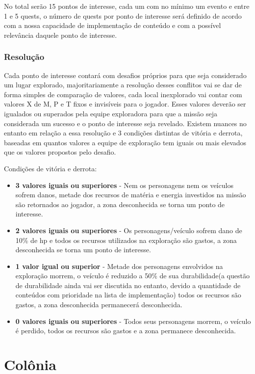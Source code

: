 \documentclass[11pt]{article} %
\begin{document}
No total serão 15 pontos de interesse, cada um com no mínimo um evento e entre 1 e 5 quests, o número de quests por ponto de interesse será definido de acordo com a nossa capacidade de implementação de conteúdo e com a possível relevância daquele ponto de interesse.

\subsubsection{Resolução}
Cada ponto de interesse contará com desafios próprios para que seja considerado um lugar explorado, majoritariamente a resolução desses conflitos vai se dar de forma simples de comparação de valores, cada local inexplorado vai contar com valores X de M, P e T fixos e invisíveis para o jogador. Esses valores deverão ser igualados ou superados pela equipe exploradora para que a missão seja considerada um sucesso e o ponto de interesse seja revelado. Existem nuances no entanto em relação a essa resolução e 3 condições distintas de vitória e derrota, baseadas em quantos valores a equipe de exploração tem iguais ou mais elevados que os valores propostos pelo desafio.

Condições de vitória e derrota:
\begin{itemize}
  \item \textbf{3 valores iguais ou superiores} - Nem os personagens nem os veículos sofrem danos, metade dos recursos de matéria e energia investidos na missão são retornados ao jogador, a zona desconhecida se torna um ponto de interesse.
  \item \textbf{2 valores iguais ou superiores} - Os personagens/veículo sofrem dano de 10\% de hp e todos os recursos utilizados na exploração são gastos, a zona desconhecida se torna um ponto de interesse.
  \item \textbf{1 valor igual ou superior} - Metade dos personagens envolvidos na exploração morrem, o veículo é reduzido a 50\% de sua durabilidade(a questão de durabilidade ainda vai ser discutida no entanto, devido a quantidade de conteúdos com prioridade na lista de implementação) todos os recursos são gastos, a zona desconhecida permanecerá desconhecida.
  \item \textbf{0 valores iguais ou superiores} - Todos seus personagens morrem, o veículo é perdido, todos os recursos são gastos e a zona permanece desconhecida.
\end{itemize}

\section{Colônia}
\end{document}
